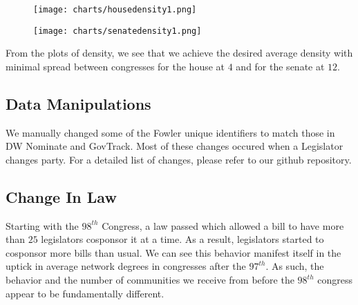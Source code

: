 \begin{figure}[h!]
    \texttt{[image: charts/housedensity1.png]}
\end{figure}

\begin{figure}[h!]
    \texttt{[image: charts/senatedensity1.png]}
\end{figure}

From the plots of density, we see that we achieve the desired average density 
with minimal spread between congresses for the house at $4$ and 
for the senate at $12$.

\subsection{Data Manipulations}

We manually changed some of the Fowler unique identifiers to match those in  DW
Nominate and GovTrack. Most of these changes occured when a Legislator  changes
party. For a detailed list of changes, please refer to our github repository.

\subsection{Change In Law}

Starting with the $98^{th}$ Congress, a law passed which allowed a bill to have
more than $25$ legislators cosponsor it at a time. As a result, legislators
started to cosponsor more bills than usual. We can see this behavior manifest
itself in the uptick in average network degrees in congresses after the
$97^{th}$. As such, the behavior and the number of communities we receive from
before the $98^{th}$ congress appear to be fundamentally different.
